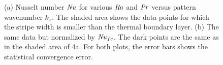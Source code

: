 \documentclass{jfm}
\newcommand\Pran{\mbox{\textit{Pr}}} %
\newcommand\Ray{\mbox{\textit{Ra}}}  %
\newcommand\Nus{\mbox{\textit{Nu}}}  %
\begin{document}
\begin{figure}
\centering
{}
\caption{%
(a) Nusselt number $\Nus$ for various $\Ray$
and $\Pran$ versus pattern wavenumber $k_x$. The shaded area shows the
data points for which the stripe width is smaller than the thermal
boundary layer. (b) The same data but normalized by $\Nus_{fc}$. The dark
points are the same as in the shaded area of 4a. For both plots, the error
bars shows the statistical convergence error.}
\label{figure3}
\end{figure}
\end{document}

